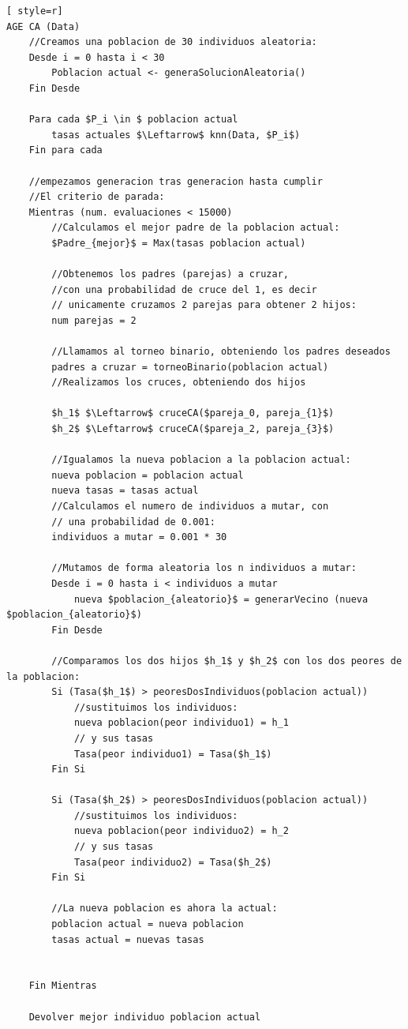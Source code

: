 \begin{lstlisting}[ style=r]
AGE CA (Data)
	//Creamos una poblacion de 30 individuos aleatoria:
	Desde i = 0 hasta i < 30
		Poblacion actual <- generaSolucionAleatoria()
	Fin Desde
	
	Para cada $P_i \in $ poblacion actual
		tasas actuales $\Leftarrow$ knn(Data, $P_i$)
	Fin para cada
	
	//empezamos generacion tras generacion hasta cumplir
	//El criterio de parada:
	Mientras (num. evaluaciones < 15000)
		//Calculamos el mejor padre de la poblacion actual:
		$Padre_{mejor}$ = Max(tasas poblacion actual)
		
		//Obtenemos los padres (parejas) a cruzar, 
		//con una probabilidad de cruce del 1, es decir
		// unicamente cruzamos 2 parejas para obtener 2 hijos:
		num parejas = 2
		
		//Llamamos al torneo binario, obteniendo los padres deseados
		padres a cruzar = torneoBinario(poblacion actual)
		//Realizamos los cruces, obteniendo dos hijos
		
		$h_1$ $\Leftarrow$ cruceCA($pareja_0, pareja_{1}$)
		$h_2$ $\Leftarrow$ cruceCA($pareja_2, pareja_{3}$)
		
		//Igualamos la nueva poblacion a la poblacion actual:
		nueva poblacion = poblacion actual
		nueva tasas = tasas actual
		//Calculamos el numero de individuos a mutar, con
		// una probabilidad de 0.001:
		individuos a mutar = 0.001 * 30
		
		//Mutamos de forma aleatoria los n individuos a mutar:
		Desde i = 0 hasta i < individuos a mutar
			nueva $poblacion_{aleatorio}$ = generarVecino (nueva $poblacion_{aleatorio}$)
		Fin Desde
		
		//Comparamos los dos hijos $h_1$ y $h_2$ con los dos peores de la poblacion:
		Si (Tasa($h_1$) > peoresDosIndividuos(poblacion actual))
			//sustituimos los individuos:
			nueva poblacion(peor individuo1) = h_1
			// y sus tasas
			Tasa(peor individuo1) = Tasa($h_1$)
		Fin Si
		
		Si (Tasa($h_2$) > peoresDosIndividuos(poblacion actual))
			//sustituimos los individuos:
			nueva poblacion(peor individuo2) = h_2
			// y sus tasas
			Tasa(peor individuo2) = Tasa($h_2$)
		Fin Si
		
		//La nueva poblacion es ahora la actual:
		poblacion actual = nueva poblacion
		tasas actual = nuevas tasas


	Fin Mientras
	
	Devolver mejor individuo poblacion actual
\end{lstlisting}



